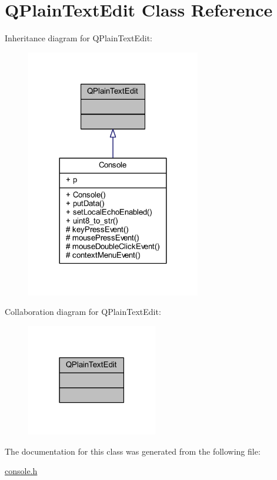 \hypertarget{a00011}{\section{Q\+Plain\+Text\+Edit Class Reference}
\label{a00011}
}


Inheritance diagram for Q\+Plain\+Text\+Edit\+:
\nopagebreak
\begin{figure}[H]
\begin{center}
\leavevmode
\includegraphics[width=216pt]{db/d7b/a00296}
\end{center}
\end{figure}


Collaboration diagram for Q\+Plain\+Text\+Edit\+:
\nopagebreak
\begin{figure}[H]
\begin{center}
\leavevmode
\includegraphics[width=162pt]{d3/d4a/a00297}
\end{center}
\end{figure}


The documentation for this class was generated from the following file\+:\begin{DoxyCompactItemize}
\item 
\hyperlink{a00033}{console.\+h}\end{DoxyCompactItemize}
